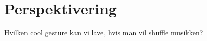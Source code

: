 \chapter{Perspektivering}
\label{Perspektivering}
Hvilken cool gesture kan vi lave, hvis man vil shuffle musikken?